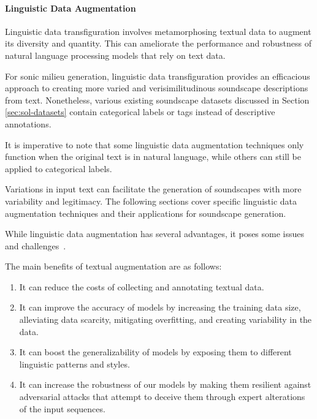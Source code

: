 \paragraph{Linguistic Data Augmentation} \label{sec:text-augmentation}

Linguistic data transfiguration involves metamorphosing textual data to augment its diversity and quantity. This can ameliorate the performance and robustness of natural language processing models that rely on text data.   

For sonic milieu generation, linguistic data transfiguration provides an efficacious approach to creating more varied and verisimilitudinous soundscape descriptions from text. Nonetheless, various existing soundscape datasets discussed in Section \ref{sec:sol-datasets} contain categorical labels or tags instead of descriptive annotations.   

It is imperative to note that some linguistic data augmentation techniques only function when the original text is in natural language, while others can still be applied to categorical labels.

Variations in input text can facilitate the generation of soundscapes with more variability and legitimacy. The following sections cover specific linguistic data augmentation techniques and their applications for soundscape generation.

While linguistic data augmentation has several advantages, it poses some issues and challenges~\cite{shorten_text_2021}.

The main benefits of textual augmentation are as follows:
\begin{enumerate}
    \item It can reduce the costs of collecting and annotating textual data.
    \item It can improve the accuracy of models by increasing the training data size, alleviating data scarcity, mitigating overfitting, and creating variability in the data. 
    \item It can boost the generalizability of models by exposing them to different linguistic patterns and styles. 
    \item It can increase the robustness of our models by making them resilient against adversarial attacks that attempt to deceive them through expert alterations of the input sequences.  
\end{enumerate}

